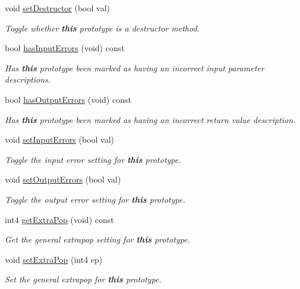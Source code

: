 \begin{DoxyCompactItemize}
void \mbox{\hyperlink{class_func_proto_aa191f5c52ce98ba14ef14f63a763a7da}{set\+Destructor}} (bool val)
\begin{DoxyCompactList}\small\item\em Toggle whether {\bfseries{this}} prototype is a {\itshape destructor} method. \end{DoxyCompactList}\item 
bool \mbox{\hyperlink{class_func_proto_abeba6c216afa6ad43160d69a10433fab}{has\+Input\+Errors}} (void) const
\begin{DoxyCompactList}\small\item\em Has {\bfseries{this}} prototype been marked as having an incorrect input parameter descriptions. \end{DoxyCompactList}\item 
bool \mbox{\hyperlink{class_func_proto_ace0306cd7ee2a040dd783bd5e7606370}{has\+Output\+Errors}} (void) const
\begin{DoxyCompactList}\small\item\em Has {\bfseries{this}} prototype been marked as having an incorrect return value description. \end{DoxyCompactList}\item 
void \mbox{\hyperlink{class_func_proto_ad5f36aaa3e2d1d7cdc90d101065abbc0}{set\+Input\+Errors}} (bool val)
\begin{DoxyCompactList}\small\item\em Toggle the input error setting for {\bfseries{this}} prototype. \end{DoxyCompactList}\item 
void \mbox{\hyperlink{class_func_proto_ac8eacd70fbc6e4cd5d694d2ae5b1ed64}{set\+Output\+Errors}} (bool val)
\begin{DoxyCompactList}\small\item\em Toggle the output error setting for {\bfseries{this}} prototype. \end{DoxyCompactList}\item 
int4 \mbox{\hyperlink{class_func_proto_a256f0d04256e214c44b653501514c3e0}{get\+Extra\+Pop}} (void) const
\begin{DoxyCompactList}\small\item\em Get the general {\itshape extrapop} setting for {\bfseries{this}} prototype. \end{DoxyCompactList}\item 
void \mbox{\hyperlink{class_func_proto_af32fa24642ff5423ec167e6f8bca065a}{set\+Extra\+Pop}} (int4 ep)
\begin{DoxyCompactList}\small\item\em Set the general {\itshape extrapop} for {\bfseries{this}} prototype. \end{DoxyCompactList}\item 

\end{DoxyCompactItemize}
